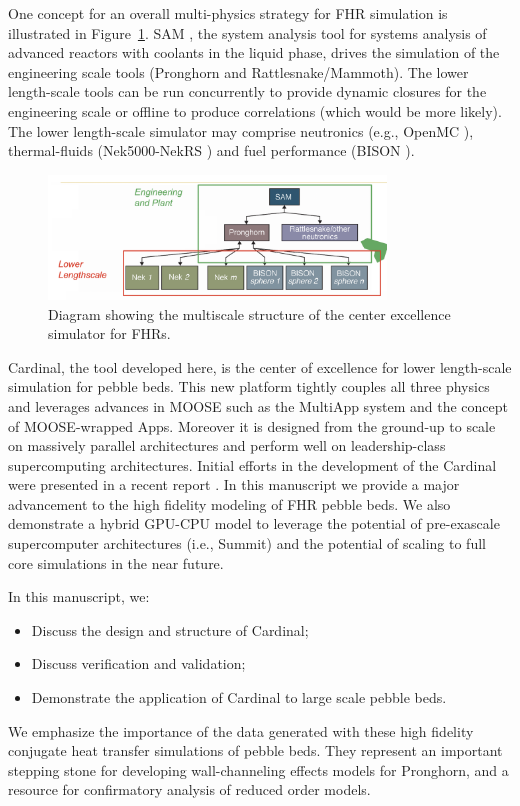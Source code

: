 One concept for an overall multi-physics strategy for FHR simulation is illustrated in Figure~\ref{f:fhr1}. SAM \cite{hu2017sam}, the system analysis tool for systems analysis of advanced reactors with coolants in the liquid phase, drives the simulation of the engineering scale tools (Pronghorn and Rattlesnake/Mammoth). The lower length-scale tools can be run concurrently to provide dynamic closures for the engineering scale or offline to produce correlations (which would be more likely). The lower length-scale simulator may comprise neutronics (e.g., OpenMC \cite{romano2013openmc}), thermal-fluids (Nek5000-NekRS \cite{fischer2008}) and fuel performance (BISON \cite{hales2013triso}).

\begin{figure}[!h]
\centering
\includegraphics[clip=true,width=0.8\textwidth]{Figures/fhr_graph}
\caption{Diagram showing the multiscale structure of the center excellence simulator for FHRs.}
\label{f:fhr1}
\end{figure}

Cardinal, the tool developed here, is the center of excellence for lower length-scale simulation for pebble beds. This new platform tightly couples all three physics and leverages advances in MOOSE \cite{gaston2009moose} such as the MultiApp system and the concept of MOOSE-wrapped Apps. Moreover it is designed from the ground-up to scale on massively parallel architectures and perform well on leadership-class supercomputing architectures. Initial efforts in the development of the Cardinal were presented in a recent report \cite{cardinal}. In this manuscript we provide a major advancement to the high fidelity modeling of FHR pebble beds. We also demonstrate a hybrid GPU-CPU model to leverage the potential of pre-exascale supercomputer architectures (i.e., Summit) and the potential of scaling to full core simulations in the near future.

In this manuscript, we:
\begin{itemize}
\item Discuss the design and structure of Cardinal;
\item Discuss verification and validation;
\item Demonstrate the application of Cardinal to large scale pebble beds.
\end{itemize}

We emphasize the importance of the data generated with these high fidelity conjugate heat transfer simulations of pebble beds. They represent an important stepping stone for developing wall-channeling effects models for Pronghorn, and a resource for confirmatory analysis of reduced order models.
